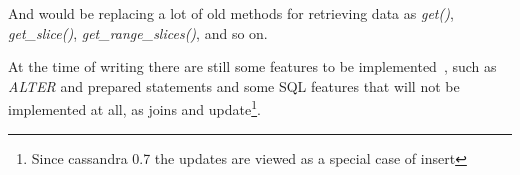 And would be replacing a lot of old methods for retrieving data as \emph{get()}, \emph{get\_slice()}, \emph{get\_range\_slices()}, and so on.	

At the time of writing there are still some features to be implemented~\cite{cqlbbw}, such as \emph{ALTER} and prepared statements and some SQL features that will not be implemented at all, as joins and update\footnote{Since cassandra 0.7 the updates are viewed as a special case of insert}.
